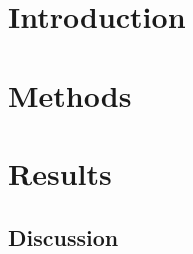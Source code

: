 \documentclass[fleqn,10pt]{olplainarticle}
\title{}
\author[1]{}
\begin{document}
\flushbottom
\maketitle
\thispagestyle{empty}
\section*{Introduction}
\label{sec:introduction}

\section*{Methods}
\label{sec:methods}

\section*{Results}
\label{sec:results}

\subsection*{Discussion}
\label{sec:discussion}



\end{document}
